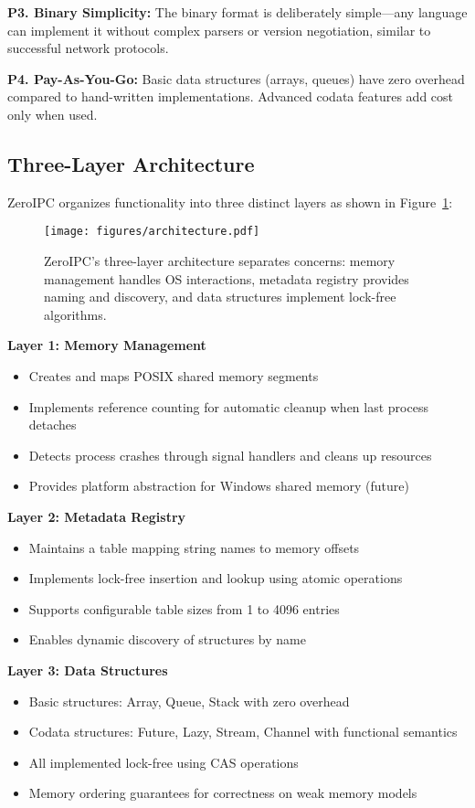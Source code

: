 \documentclass[11pt]{article}
\begin{document}
\textbf{P3. Binary Simplicity:} The binary format is deliberately simple---any language can implement it without complex parsers or version negotiation, similar to successful network protocols.

\textbf{P4. Pay-As-You-Go:} Basic data structures (arrays, queues) have zero overhead compared to hand-written implementations. Advanced codata features add cost only when used.

\subsection{Three-Layer Architecture}

ZeroIPC organizes functionality into three distinct layers as shown in Figure~\ref{fig:architecture}:

\begin{figure}[h]
\centering
\texttt{[image: figures/architecture.pdf]}
\caption{ZeroIPC's three-layer architecture separates concerns: memory management handles OS interactions, metadata registry provides naming and discovery, and data structures implement lock-free algorithms.}
\label{fig:architecture}
\end{figure}

\textbf{Layer 1: Memory Management}
\begin{itemize}
\item Creates and maps POSIX shared memory segments
\item Implements reference counting for automatic cleanup when last process detaches
\item Detects process crashes through signal handlers and cleans up resources
\item Provides platform abstraction for Windows shared memory (future)
\end{itemize}

\textbf{Layer 2: Metadata Registry}
\begin{itemize}
\item Maintains a table mapping string names to memory offsets
\item Implements lock-free insertion and lookup using atomic operations
\item Supports configurable table sizes from 1 to 4096 entries
\item Enables dynamic discovery of structures by name
\end{itemize}

\textbf{Layer 3: Data Structures}
\begin{itemize}
\item Basic structures: Array, Queue, Stack with zero overhead
\item Codata structures: Future, Lazy, Stream, Channel with functional semantics
\item All implemented lock-free using CAS operations
\item Memory ordering guarantees for correctness on weak memory models
\end{itemize}
\end{document}
